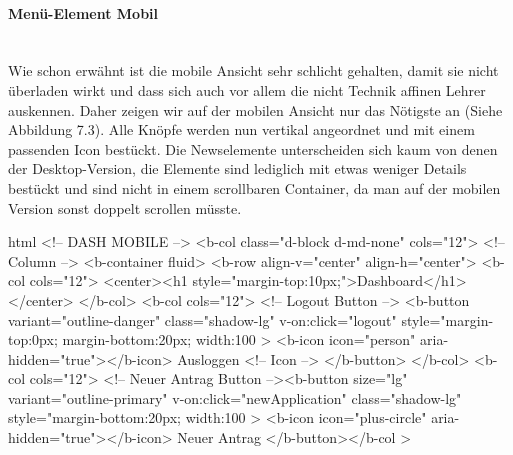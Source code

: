 \paragraph{Menü-Element Mobil}
~\\
Wie schon erwähnt ist die mobile Ansicht sehr schlicht gehalten, damit sie nicht überladen wirkt und dass sich auch vor allem die nicht Technik affinen Lehrer auskennen. Daher zeigen wir auf der mobilen Ansicht nur das Nötigste an (Siehe Abbildung 7.3). Alle Knöpfe werden nun vertikal angeordnet und mit einem passenden Icon bestückt. Die Newselemente unterscheiden sich kaum von denen der Desktop-Version, die Elemente sind lediglich mit etwas weniger Details bestückt und sind nicht in einem scrollbaren Container, da man auf der mobilen Version sonst doppelt scrollen müsste.
\begin{code}{html}
	<!-- DASH MOBILE -->
	<b-col class="d-block d-md-none" cols="12">
	  <!-- Column -->
	  <b-container fluid>
		<b-row align-v="center" align-h="center">
		  <b-col cols="12">
			<center><h1 style="margin-top:10px;">Dashboard</h1></center>
		  </b-col>
		  <b-col cols="12">
			<!-- Logout Button -->
			<b-button
			  variant="outline-danger"
			  class="shadow-lg"
			  v-on:click="logout"
			  style="margin-top:0px; margin-bottom:20px; width:100%
			>
			  <b-icon icon="person" aria-hidden="true"></b-icon> Ausloggen
			  <!-- Icon -->
			</b-button>
		  </b-col>
		  <b-col cols="12">
			<!-- Neuer Antrag Button --><b-button
			  size="lg"
			  variant="outline-primary"
			  v-on:click="newApplication"
			  class="shadow-lg"
			  style="margin-bottom:20px; width:100%
			>
			  <b-icon icon="plus-circle" aria-hidden="true"></b-icon> Neuer
			  Antrag
			</b-button></b-col
		  >	
\end{code}
	\label{list:startmobile} ~\\
